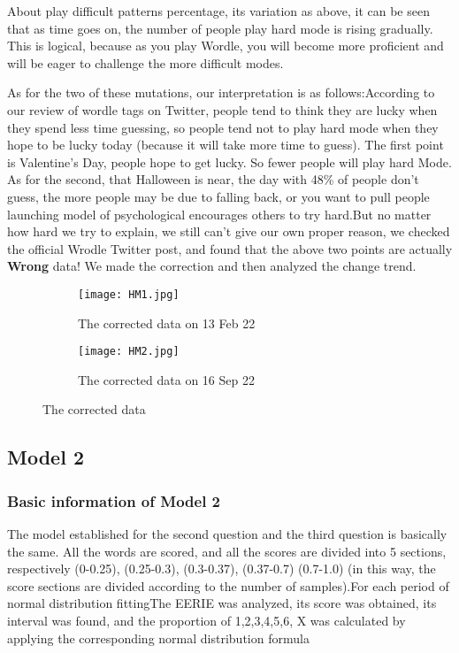 \documentclass[12pt]{article}  %
\begin{document}
About play difficult patterns percentage, its variation as above, it can be seen that as time goes on, the number of people play hard mode is rising gradually. This is logical, because as you play Wordle, you will become more proficient and will be eager to challenge the more difficult modes.


As for the two of these mutations, our interpretation is as follows:According to our review of wordle tags on Twitter, people tend to think they are lucky when they spend less time guessing, so people tend not to play hard mode when they hope to be lucky today (because it will take more time to guess). The first point is Valentine's Day, people hope to get lucky. So fewer people will play hard Mode.
As for the second, that Halloween is near, the day with 48\% of people don't guess, the more people may be due to falling back, or you want to pull people launching model of psychological encourages others to try hard.But no matter how hard we try to explain, we still can't give our own proper reason, we checked the official Wrodle Twitter post, and found that the above two points are actually \textbf{Wrong} data! We made the correction and then analyzed the change trend.

\clearpage



\begin{figure}[htbp]
	
	\begin{subfigure}[b]{.5\textwidth}
		\texttt{[image: HM1.jpg]}
		\caption{The corrected data on 13 Feb 22}\label{subfig:left}
	\end{subfigure}
	\begin{subfigure}[b]{.455\textwidth}
		\texttt{[image: HM2.jpg]}
		\caption{The corrected data on 16 Sep 22}\label{subfig:right}
	\end{subfigure}
	\caption{The corrected data }\label{fig:subfigures}
\end{figure}


\subsection{Model 2}
\subsubsection{Basic information of Model 2}
The model established for the second question and the third question is basically the same. All the words are scored, and all the scores are divided into 5 sections, respectively (0-0.25), (0.25-0.3), (0.3-0.37), (0.37-0.7) (0.7-1.0) (in this way, the score sections are divided according to the number of samples).For each period of normal distribution fittingThe EERIE was analyzed, its score was obtained, its interval was found, and the proportion of 1,2,3,4,5,6, X was calculated by applying the corresponding normal distribution formula
\end{document}
